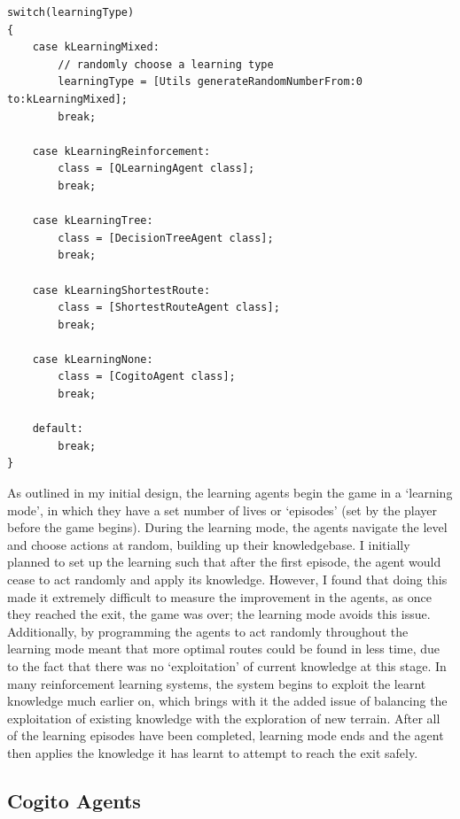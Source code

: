 \documentclass[a4paper,oneside]{report}
\begin{document}
\begin{lstlisting}[label={lst:LearningType},caption=Switch Statement for Setting Learning Type]
switch(learningType) 
{                
	case kLearningMixed:
    	// randomly choose a learning type
        learningType = [Utils generateRandomNumberFrom:0 to:kLearningMixed]; 
        break;
                
    case kLearningReinforcement:
        class = [QLearningAgent class];
        break;
                
    case kLearningTree:
        class = [DecisionTreeAgent class];
        break;
                
    case kLearningShortestRoute:
        class = [ShortestRouteAgent class];
        break;
         
    case kLearningNone:
        class = [CogitoAgent class];
        break;
                
    default:
        break;
}
\end{lstlisting}

As outlined in my initial design, the learning agents begin the game in a `learning mode', in which they have a set number of lives or `episodes' (set by the player before the game begins). During the learning mode, the agents navigate the level and choose actions at random, building up their knowledgebase. I initially planned to set up the learning such that after the first episode, the agent would cease to act randomly and apply its knowledge. However, I found that doing this made it extremely difficult to measure the improvement in the agents, as once they reached the exit, the game was over; the learning mode avoids this issue. Additionally, by programming the agents to act randomly throughout the learning mode meant that more optimal routes could be found in less time, due to the fact that there was no `exploitation' of current knowledge at this stage. In many reinforcement learning systems, the system begins to exploit the learnt knowledge much earlier on, which brings with it the added issue of balancing the exploitation of existing knowledge with the exploration of new terrain. After all of the learning episodes have been completed, learning mode ends and the agent then applies the knowledge it has learnt to attempt to reach the exit safely.

\subsection{Cogito Agents}
\end{document}
